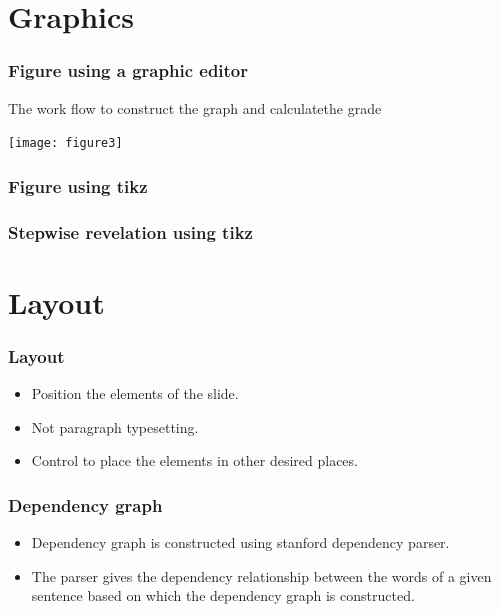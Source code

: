 \documentclass[11pt]{beamer}
\begin{document}
\section{Graphics}
\begin{frame}
  \frametitle{Figure using a graphic editor}
  The work flow to construct the graph and calculatethe grade
  \begin{center}
    \texttt{[image: figure3]}
  \end{center}
\end{frame}

\begin{frame}
  \frametitle{Figure using tikz}
  \begin{center}
    
  \end{center}
\end{frame}

\begin{frame}
  \frametitle{Stepwise revelation using tikz}
  \begin{center}
    
  \end{center}
\end{frame}

\section{Layout}

\begin{frame}
  \frametitle{Layout}
  \begin{itemize}
  \item Position the elements of the slide.
  \item Not paragraph typesetting.
  \item Control to place the elements in other desired places.
  \end{itemize}
\end{frame}

\begin{frame}
  \frametitle{Dependency graph}
    \begin{itemize}
    \item Dependency graph is constructed using stanford
      dependency parser.
    \item The parser gives the dependency relationship between
      the words of a given sentence based on which the
      dependency graph is constructed.
    \end{itemize}
\end{frame}
\end{document}
